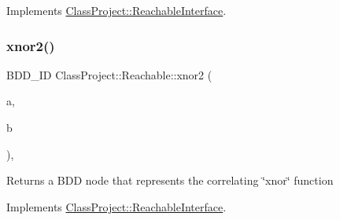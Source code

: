 Implements \hyperlink{classClassProject_1_1ReachableInterface_a005d8d8375b8d4e9f7c7d1a0ff01a97f}{Class\+Project\+::\+Reachable\+Interface}.

\mbox{\label{classClassProject_1_1Reachable_a7f97f9868c825b64f333c4bc8eb7632b}} 
\subsubsection{\texorpdfstring{xnor2()}{xnor2()}}
{\footnotesize\ttfamily B\+D\+D\+\_\+\+ID Class\+Project\+::\+Reachable\+::xnor2 (\begin{DoxyParamCaption}\item[{B\+D\+D\+\_\+\+ID}]{a,  }\item[{B\+D\+D\+\_\+\+ID}]{b }\end{DoxyParamCaption})\hspace{0.3cm}{\ttfamily [override]}, {\ttfamily [virtual]}}

\begin{DoxyReturn}{Returns}
a B\+DD node that represents the correlating \char`\"{}xnor\char`\"{} function 
\end{DoxyReturn}


Implements \hyperlink{classClassProject_1_1ReachableInterface_a80163dcb8b1d982b4fb7f8614808dece}{Class\+Project\+::\+Reachable\+Interface}.

